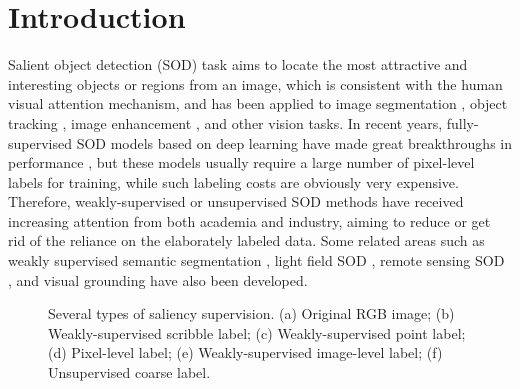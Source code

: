 \documentclass[journal]{IEEEtran}
\begin{document}
\section{Introduction}
Salient object detection (SOD) task aims to locate the most attractive and interesting objects or regions from an image, which is consistent with the human visual attention mechanism, and has been applied to image segmentation \cite{sun2019saliency, DBLP:journals/tcsv/ShiXZZWLZ22, DBLP:journals/tcsv/JiSLCM21,crmACMMM20-1,BCNet,crmcovid1,crmcovid2}, object tracking \cite{li2019siamrpn++, DBLP:journals/tcsv/LinFHGT21}, image enhancement \cite{crmbrain,crmJEI,crmCVPR21,crmSPIC,crmsrijcai,crmSRInpaintor,crmdsr2019tip,crmblindSR22}, and other vision tasks.
In recent years, fully-supervised SOD models based on deep learning have made great breakthroughs in performance \cite{chen2020global,crmCoADNet,crmDPANet,crmDBLP:journals/tip/WenYZCSZZBD21,crm2020tc,crmDBLP:journals/tmm/MaoJCGSK22,crmglnet,crmMM21}, but these models usually require a large number of pixel-level labels for training, while such labeling costs are obviously very expensive. Therefore, weakly-supervised or unsupervised SOD methods have received increasing attention from both academia and industry, aiming to reduce or get rid of the reliance on the elaborately labeled data. Some related areas such as weakly supervised semantic segmentation \cite{9440699,DBLP:journals/pr/ZhangXWHLZ22,DBLP:journals/corr/abs-2108-01296,DBLP:conf/aaai/ZhangXWSH20,zhangijcai2022},
light field SOD \cite{DBLP:journals/corr/abs-2204-13456,crm-acmmm}, remote sensing SOD \cite{DBLP:journals/corr/abs-2202-03501,crmRRNet,crm2019tgrs,crm-nc,dafnet,crm2022rsi}, and visual grounding \cite{9667277,DBLP:journals/pami/SunXLLG21} have also been developed.





\begin{figure}[!t]

 \hfill 	
 \hfill	
  \newline
 \hfill 	
 \hfill	
\caption{Several types of saliency supervision. (a) Original RGB image; (b) Weakly-supervised scribble label; (c) Weakly-supervised point label; (d) Pixel-level label; (e) Weakly-supervised image-level label; (f) Unsupervised coarse label.}
\label{level}
\end{figure}
\end{document}
